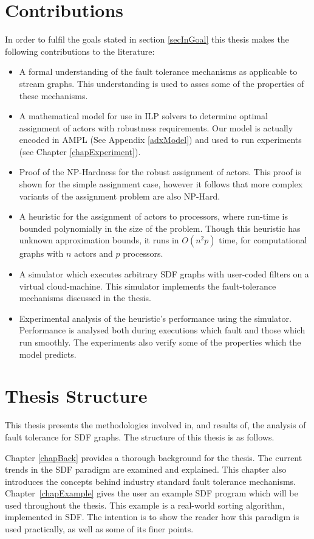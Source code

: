 \section{Contributions}

In order to fulfil the goals stated in section \ref{secInGoal} this thesis makes the following contributions to the literature:

\begin{itemize}
	\item A formal understanding of the fault tolerance mechanisms as applicable to stream graphs.
			This understanding is used to asses some of the properties of these mechanisms.
	\item A mathematical model for use in ILP solvers to determine optimal assignment of actors with robustness requirements.
			Our model is actually encoded in AMPL (See Appendix \ref{adxModel}) and used to run experiments (see Chapter \ref{chapExperiment}).
	\item Proof of the NP-Hardness for the robust assignment of actors.
			This proof is shown for the simple assignment case, however it follows that more complex variants of the assignment problem are also NP-Hard.
	\item A heuristic for the assignment of actors to processors, where run-time is bounded polynomially in the size of the problem.
			Though this heuristic has unknown approximation bounds, it runs in $O(n^2 p)$ time, for computational graphs with $n$ actors and $p$ processors.
	\item A simulator which executes arbitrary SDF graphs with user-coded filters on a virtual cloud-machine.
			This simulator implements the fault-tolerance mechanisms discussed in the thesis.
	\item Experimental analysis of the heuristic's performance using the simulator.
			Performance is analysed both during executions which fault and those which run smoothly.
			The experiments also verify some of the properties which the model predicts.
\end{itemize}

\section{Thesis Structure}

This thesis presents the methodologies involved in, and results of, the analysis of fault tolerance for SDF graphs.
The structure of this thesis is as follows.

Chapter \ref{chapBack} provides a thorough background for the thesis.
The current trends in the SDF paradigm are examined and explained.
This chapter also introduces the concepts behind industry standard fault tolerance mechanisms.
Chapter~\ref{chapExample} gives the user an example SDF program which will be used throughout the thesis.
This example is a real-world sorting algorithm, implemented in SDF.
The intention is to show the reader how this paradigm is used practically, as well as some of its finer points.

